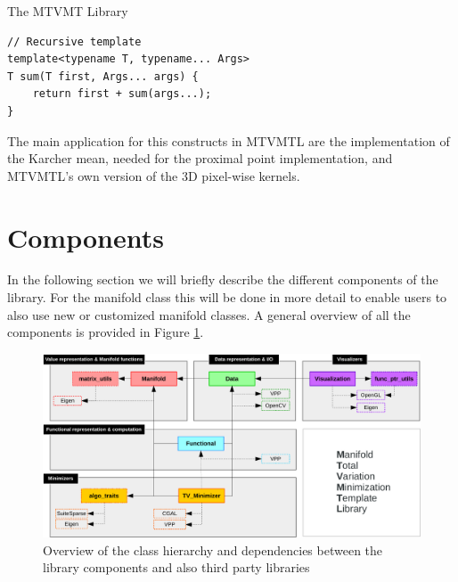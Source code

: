 \begin{chapter}{The MTVMT Library}
\begin{lstlisting}[label=code:variadic,caption={Variadic template example}]
// Recursive template
template<typename T, typename... Args>
T sum(T first, Args... args) {
    return first + sum(args...);
}
\end{lstlisting}

The main application for this constructs in MTVMTL are the implementation of the Karcher mean, needed for the proximal point implementation, and MTVMTL's own version
of the 3D pixel-wise kernels.


\section{Components} %
\label{sec:Components}
In the following section we will briefly describe the different components of the library. For the manifold class this will be done in more detail to enable users to
also use new or customized manifold classes. A general overview of all the components is provided in Figure \ref{fig:components}.
\begin{figure}[h!]
        \centering
	    \includegraphics[width=1.0\linewidth]{./figures/library/components.pdf}
	\caption[Overview of library components]{Overview of the class hierarchy and dependencies between the library components and also third party libraries
	}
	\label{fig:components}
\end{figure}


\end{chapter}
